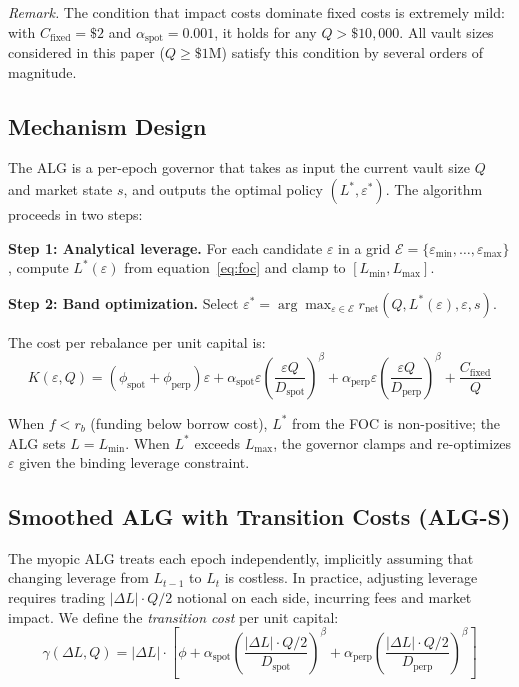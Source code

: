 \documentclass[11pt]{article}
\begin{document}
\textit{Remark.} The condition that impact costs dominate fixed costs is extremely mild: with $C_{\text{fixed}} = \$2$ and $\alpha_{\text{spot}} = 0.001$, it holds for any $Q > \$10{,}000$. All vault sizes considered in this paper ($Q \geq \$1$M) satisfy this condition by several orders of magnitude.

\subsection{Mechanism Design}

The ALG is a per-epoch governor that takes as input the current vault size $Q$ and market state $s$, and outputs the optimal policy $(L^*, \varepsilon^*)$. The algorithm proceeds in two steps:

\textbf{Step 1: Analytical leverage.} For each candidate $\varepsilon$ in a grid $\mathcal{E} = \{\varepsilon_{\min}, \ldots, \varepsilon_{\max}\}$, compute $L^*(\varepsilon)$ from equation~\eqref{eq:foc} and clamp to $[L_{\min}, L_{\max}]$.

\textbf{Step 2: Band optimization.} Select $\varepsilon^* = \arg\max_{\varepsilon \in \mathcal{E}} r_{\text{net}}(Q, L^*(\varepsilon), \varepsilon, s)$.

The cost per rebalance per unit capital is:
\begin{equation}
K(\varepsilon, Q) = (\phi_{\text{spot}} + \phi_{\text{perp}}) \varepsilon + \alpha_{\text{spot}} \varepsilon \left(\frac{\varepsilon Q}{D_{\text{spot}}}\right)^\beta + \alpha_{\text{perp}} \varepsilon \left(\frac{\varepsilon Q}{D_{\text{perp}}}\right)^\beta + \frac{C_{\text{fixed}}}{Q}
\end{equation}

When $f < r_b$ (funding below borrow cost), $L^*$ from the FOC is non-positive; the ALG sets $L = L_{\min}$. When $L^*$ exceeds $L_{\max}$, the governor clamps and re-optimizes $\varepsilon$ given the binding leverage constraint.

\subsection{Smoothed ALG with Transition Costs (ALG-S)}

The myopic ALG treats each epoch independently, implicitly assuming that changing leverage from $L_{t-1}$ to $L_t$ is costless. In practice, adjusting leverage requires trading $|\Delta L| \cdot Q/2$ notional on each side, incurring fees and market impact. We define the \textit{transition cost} per unit capital:
\begin{equation}
\gamma(\Delta L, Q) = |\Delta L| \cdot \left[ \phi + \alpha_{\text{spot}} \left(\frac{|\Delta L| \cdot Q/2}{D_{\text{spot}}}\right)^{\!\beta} + \alpha_{\text{perp}} \left(\frac{|\Delta L| \cdot Q/2}{D_{\text{perp}}}\right)^{\!\beta} \right]
\label{eq:transition_cost}
\end{equation}
\end{document}
